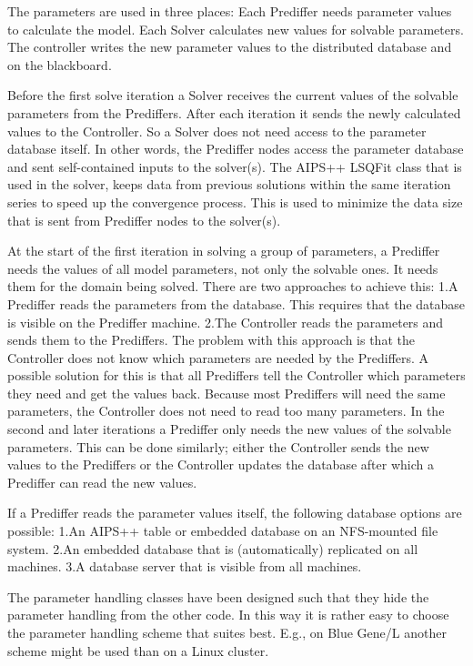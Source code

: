 \documentclass[10pt]{lofar}
\begin{document}
The parameters are used in three places:
Each Prediffer needs parameter values to calculate the model.
Each Solver calculates new values for solvable parameters.
The controller writes the new parameter values to the distributed database and on the blackboard.

Before the first solve iteration a Solver receives the current values of the solvable parameters from the Prediffers. After each iteration it sends the newly calculated values to the Controller. So a Solver does not need access to the parameter database itself. In other words, the Prediffer nodes access the parameter database and sent self-contained inputs to the solver(s).
The AIPS++ LSQFit class that is used in the solver, keeps data from previous solutions within the same iteration series to speed up the convergence process. This is used to minimize the data size that is sent from Prediffer nodes to the solver(s).

At the start of the first iteration in solving a group of parameters, a Prediffer needs the values of all model parameters, not only the solvable ones. It needs them for the domain being solved. There are two approaches to achieve this:
1.A Prediffer reads the parameters from the database. This requires that the database is visible on the Prediffer machine.
2.The Controller reads the parameters and sends them to the Prediffers.
The problem with this approach is that the Controller does not know which parameters are needed by the Prediffers. A possible solution for this is that all Prediffers tell the Controller which parameters they need and get the values back. Because most Prediffers will need the same parameters, the Controller does not need to read too many parameters.
In the second and later iterations a Prediffer only needs the new values of the solvable parameters. This can be done similarly; either the Controller sends the new values to the Prediffers or the Controller updates the database after which a Prediffer can read the new values.

If a Prediffer reads the parameter values itself, the following database options are possible:
1.An AIPS++ table or embedded database on an NFS-mounted file system.
2.An embedded database that is (automatically) replicated on all machines.
3.A database server that is visible from all machines.

The parameter handling classes have been designed such that they hide the parameter handling from the other code. In this way it is rather easy to choose the parameter handling scheme that suites best. E.g., on Blue Gene/L another scheme might be used than on a Linux cluster.
\end{document}
